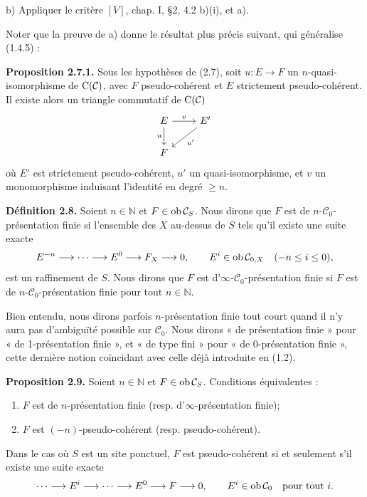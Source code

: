 \documentclass[11pt]{article}
\begin{document}
b) Appliquer le critère \([V]\), chap. I, §2, 4.2 b)(i), et a).

Noter que la preuve de a) donne le résultat plus précis suivant, qui généralise (1.4.5) :

\textbf{Proposition 2.7.1.} Sous les hypothèses de (2.7), soit \(u:E\to F\) un \(n\)-quasi-isomorphisme de \(\mathrm C(\mathcal C)\), avec \(F\) pseudo-cohérent et \(E\) strictement pseudo-cohérent. Il existe alors un triangle commutatif de \(\mathrm C(\mathcal C)\)
\[
\begin{tikzcd}
E \arrow[r,"v"] \arrow[d,"u"'] & E' \arrow[dl,"u'"]\\
F &
\end{tikzcd}
\]
où \(E'\) est strictement pseudo-cohérent, \(u'\) un quasi-isomorphisme, et \(v\) un monomorphisme induisant l'identité en degré \(\geq n\).

\textbf{Définition 2.8.} Soient \(n\in\mathbb N\) et \(F\in\operatorname{ob}\mathcal C_S\). Nous dirons que \(F\) est de \(n\)-\(\mathcal C_0\)-présentation finie si l'ensemble des \(X\) au-dessus de \(S\) tels qu'il existe une suite exacte
\[
  E^{-n}\longrightarrow\cdots\longrightarrow E^0\longrightarrow F_X\longrightarrow 0,
\qquad E^i\in\operatorname{ob}\mathcal C_{0,X}\quad(-n\leq i\leq 0),
\]
est un raffinement de \(S\). Nous dirons que \(F\) est d'\(\infty\)-\(\mathcal C_0\)-présentation finie si \(F\) est de \(n\)-\(\mathcal C_0\)-présentation finie pour tout \(n\in\mathbb N\).

Bien entendu, nous dirons parfois \(n\)-présentation finie tout court quand il n'y aura pas d'ambiguïté possible sur \(\mathcal C_0\). Nous dirons « de présentation finie » pour « de 1-présentation finie », et « de type fini » pour « de 0-présentation finie », cette dernière notion coïncidant avec celle déjà introduite en (1.2).

\textbf{Proposition 2.9.} Soient \(n\in\mathbb N\) et \(F\in\operatorname{ob}\mathcal C_S\). Conditions équivalentes :
\begin{enumerate}[label=(\roman*)]
\item \(F\) est de \(n\)-présentation finie (resp. d'\(\infty\)-présentation finie);
\item \(F\) est \((-n)\)-pseudo-cohérent (resp. pseudo-cohérent).
\end{enumerate}
Dans le cas où \(S\) est un site ponctuel, \(F\) est pseudo-cohérent si et seulement s'il existe une suite exacte
\[
  \cdots\longrightarrow E^i\longrightarrow\cdots\longrightarrow E^0\longrightarrow F\longrightarrow 0,
\qquad E^i\in\operatorname{ob}\mathcal C_0\quad\text{pour tout }i.
\]
\end{document}

